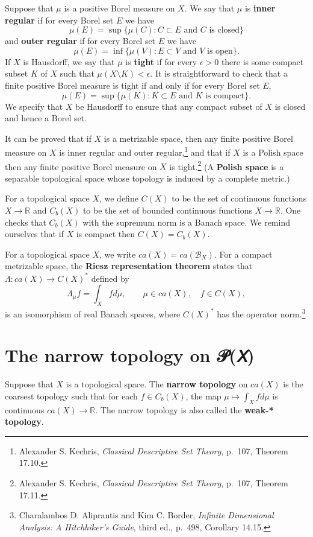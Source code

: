 \documentclass{article}
\theoremstyle{definition}
\begin{document}
Suppose that $\mu$ is a positive Borel measure on $X$. We say that $\mu$
is \textbf{inner regular} if for every Borel set $E$ we have
\[
\mu(E) = \sup\{\mu(C): \textrm{$C \subset E$ and $C$ is closed}\}
\]
and \textbf{outer regular} if for every Borel set $E$ we have
\[
\mu(E) = \inf\{\mu(V): \textrm{$E \subset V$ and $V$ is open}\}.
\]
If $X$ is Hausdorff,
we say that $\mu$ is \textbf{tight} if for every $\epsilon>0$ there is some  compact  subset $K$ of $X$ such that
$\mu(X \setminus K)<\epsilon$. It is straightforward to check that a finite positive Borel measure is tight if and only if for every Borel set $E$,
\[
\mu(E) = \sup\{\mu(K): \textrm{$K \subset E$ and $K$ is compact}\}.
\]
We specify that $X$ be Hausdorff to ensure that any compact subset of $X$ is closed and hence a Borel set. 



It can be proved that if $X$ is a metrizable space, then any finite positive Borel measure on $X$ is 
inner regular and outer regular,\footnote{Alexander S. Kechris, {\em Classical Descriptive Set Theory}, p.~107,
Theorem 17.10.} and that if $X$ is a Polish space then any finite positive Borel measure on $X$ is tight.\footnote{Alexander S. Kechris, {\em Classical Descriptive Set Theory},
p.~107,
Theorem 17.11.} (A \textbf{Polish space} is a separable topological space whose topology is induced by a  complete metric.)

For a topological space $X$, we define 
$C(X)$ to be the set of continuous functions $X \to \mathbb{R}$ and
$C_b(X)$ to be the set of bounded
continuous functions $X \to \mathbb{R}$. One checks that $C_b(X)$ with the supremum norm is a Banach space. We remind ourselves
that if $X$ is compact then $C(X)=C_b(X)$. 

For a topological space $X$, 
we write $ca(X) = ca(\mathscr{B}_X)$.
For a compact metrizable  space, the \textbf{Riesz representation theorem} states that
$\Lambda:ca(X) \to C(X)^*$ defined by
\[
\Lambda_\mu f = \int_X f d\mu, \qquad  \mu \in ca(X), \quad f \in C(X),
\]
is an isomorphism of real Banach spaces, where $C(X)^*$ has the operator norm.\footnote{Charalambos D. 
Aliprantis and Kim C. Border, {\em Infinite Dimensional Analysis: A Hitchhiker's Guide}, third ed., p.~498,
Corollary 14.15.} 


\section{The narrow topology on 𝒫(𝘟)}
Suppose that $X$ is a topological space. The \textbf{narrow topology} on $ca(X)$ is the coarsest topology such that for each
$f \in C_b(X)$, the map $\mu \mapsto \int_X f d\mu$ is continuous $ca(X) \to \mathbb{R}$. The narrow topology is also called
the \textbf{weak-* topology}. 
\end{document}
